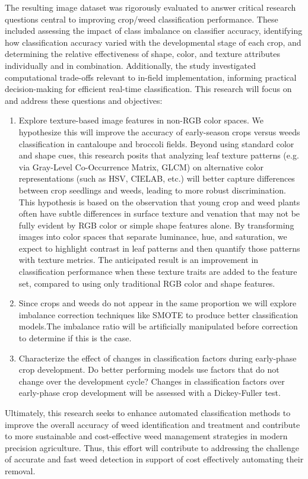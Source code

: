 \documentclass[letterpaper, notitlepage]{report}
\begin{document}
The resulting image dataset was rigorously evaluated to answer critical research questions central to improving crop/weed classification performance. These included assessing the impact of class imbalance on classifier accuracy, identifying how classification accuracy varied with the developmental stage of each crop, and determining the relative effectiveness of shape, color, and texture attributes individually and in combination. Additionally, the study investigated computational trade-offs relevant to in-field implementation, informing practical decision-making for efficient real-time classification. This research will focus on and address these questions and objectives:
\begin{enumerate}
	\item{Explore texture-based image features in non-RGB color spaces. We hypothesize this will improve the accuracy of early-season crops versus weeds classification in cantaloupe and broccoli fields. Beyond using standard color and shape cues, this research posits that analyzing leaf texture patterns (e.g. via Gray-Level Co-Occurrence Matrix, GLCM) on alternative color representations (such as HSV, CIELAB, etc.) will better capture differences between crop seedlings and weeds, leading to more robust discrimination. This hypothesis is based on the observation that young crop and weed plants often have subtle differences in surface texture and venation that may not be fully evident by RGB color or simple shape features alone. By transforming images into color spaces that separate luminance, hue, and saturation, we expect to highlight contrast in leaf patterns and then quantify those patterns with texture metrics. The anticipated result is an improvement in classification performance when these texture traits are added to the feature set, compared to using only traditional RGB color and shape features.}
	\item{Since crops and weeds do not appear in the same proportion we will explore imbalance correction techniques like SMOTE to produce better classification models.The imbalance ratio will be artificially manipulated before correction to determine if this is the case.}
	\item{Characterize the effect of changes in classification factors during early-phase crop development. Do better performing models use factors that do not change over the development cycle? Changes in classification factors over early-phase crop development will be assessed with a Dickey-Fuller test.}
\end{enumerate}
Ultimately, this research seeks to enhance automated classification methods to improve the overall accuracy of weed identification and treatment and contribute to more sustainable and cost-effective weed management strategies in modern precision agriculture. Thus, this effort will contribute to addressing the challenge of accurate and fast weed detection in support of cost effectively automating their removal.
\end{document}
